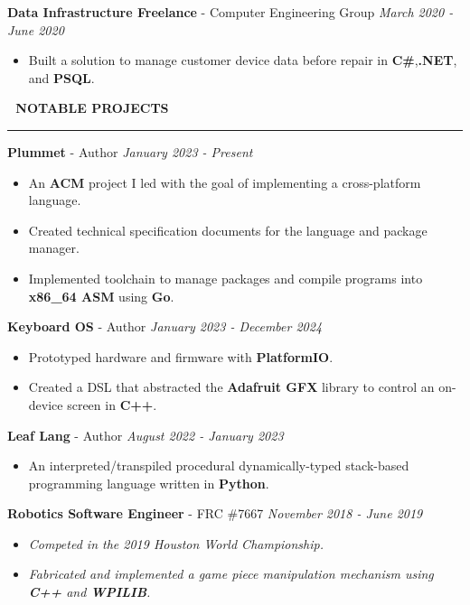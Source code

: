 \documentclass[10pt,letterpaper]{article}
\newcommand{\ProjectsIcon}{\,}
\newcommand{\customtext}[2]{%
    {\fontsize{#1}{\dimexpr #1pt+2pt}\selectfont #2}%
}
\begin{document}
\begin{flushleft}
    {\customtext{10}{\textbf{Data Infrastructure Freelance} - Computer Engineering Group}} \hfill \customtext{10}{\textit{March 2020 - June 2020}}
    \begin{itemize}
        \item \customtext{10}{Built a solution to manage customer device data before repair in \textbf{C\#},\textbf{.NET}, and \textbf{PSQL}.}
    \end{itemize}

    \vspace{10pt}


    \textcolor{headercolor}{\customtext{14}{\ProjectsIcon \ \textbf{NOTABLE PROJECTS}}}
    \textcolor{gray}{\rule{\textwidth}{2pt}}

    {\customtext{10}{\textbf{Plummet} - Author}} \hfill \customtext{10}{\textit{January 2023 - Present}}
    \begin{itemize}
        \item \customtext{10}{An \textbf{ACM} project I led with the goal of implementing a cross-platform language.}
        \item \customtext{10}{Created technical specification documents for the language and package manager.}
        \item \customtext{10}{Implemented toolchain to manage packages and compile programs into \textbf{x86\_64 ASM} using \textbf{Go}.}
    \end{itemize}

    {\customtext{10}{\textbf{Keyboard OS} - Author}} \hfill \customtext{10}{\textit{January 2023 - December 2024}}
    \begin{itemize}
        \item \customtext{10}{Prototyped hardware and firmware with \textbf{PlatformIO}.}
        \item \customtext{10}{Created a DSL that abstracted the \textbf{Adafruit GFX} library to control an on-device screen in \textbf{C++}.}
    \end{itemize}

    {\customtext{10}{\textbf{Leaf Lang} - Author}} \hfill \customtext{10}{\textit{August 2022 - January 2023}}
    \begin{itemize}
        \item \customtext{10}{An interpreted/transpiled procedural dynamically-typed stack-based programming language written in \textbf{Python}.}
    \end{itemize}

    {\customtext{10}{\textbf{Robotics Software Engineer} - FRC \#7667}} \hfill \customtext{10}{\textit{November 2018 - June 2019}}
    \begin{itemize}
        \item \customtext{10}{\textit{Competed in the 2019 Houston World Championship.}}
        \item \customtext{10}{\textit{Fabricated and implemented a game piece manipulation mechanism using \textbf{C++} and \textbf{WPILIB}.}}
    \end{itemize}

\end{flushleft}

\end{document}
